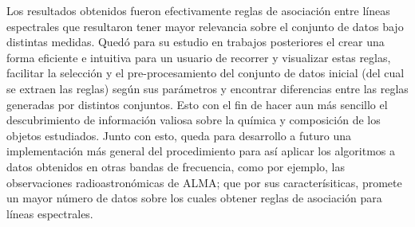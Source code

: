 \begin{intro}
Los resultados obtenidos fueron efectivamente reglas de asociación entre líneas espectrales que resultaron tener mayor relevancia sobre el conjunto de datos bajo distintas medidas. Quedó para su estudio en trabajos posteriores el crear una forma eficiente e intuitiva para un usuario de recorrer y visualizar estas reglas, facilitar la selección y el pre-procesamiento del conjunto de datos inicial (del cual se extraen las reglas) según sus parámetros y encontrar diferencias entre las reglas generadas por distintos conjuntos. Esto con el fin de hacer aun más sencillo el descubrimiento de información valiosa sobre la química y composición de los objetos estudiados. Junto con esto, queda para desarrollo a futuro una implementación más general del procedimiento para así aplicar los algoritmos a datos obtenidos en otras bandas de frecuencia, como por ejemplo, las observaciones radioastronómicas de ALMA; que por sus caracterísiticas, promete un mayor número de datos sobre los cuales obtener reglas de asociación para líneas espectrales.

\end{intro}